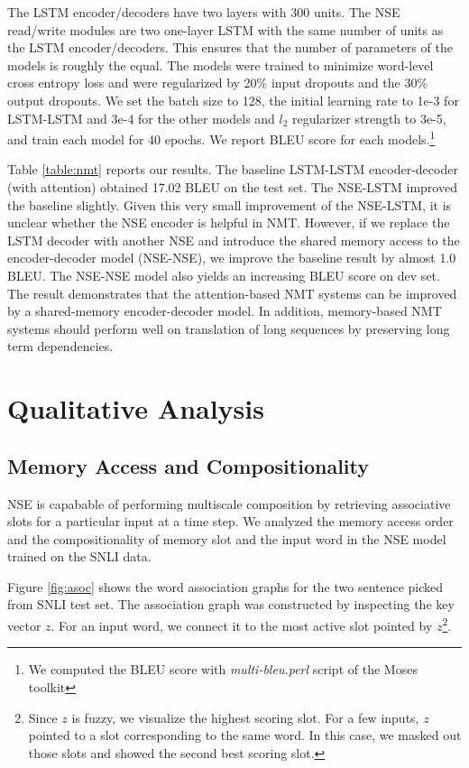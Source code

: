 \documentclass{article}
\begin{document}
The LSTM encoder/decoders have two layers with 300 units. The NSE read/write modules are two one-layer LSTM with the same number of units as the LSTM encoder/decoders. This ensures that the number of parameters of the models is roughly the equal. The models were trained to minimize word-level cross entropy loss and were regularized by 20\% input dropouts and the 30\% output dropouts. We set the batch size to 128, the initial learning rate to 1e-3 for LSTM-LSTM and 3e-4 for the other models and $l_2$ regularizer strength to 3e-5, and train each model for 40 epochs. We report BLEU score for each models.\footnote{We computed the BLEU score with \textit{multi-bleu.perl} script of the Moses toolkit}

Table \ref{table:nmt} reports our results. The baseline LSTM-LSTM encoder-decoder (with attention) obtained 17.02 BLEU on the test set. The NSE-LSTM improved the baseline slightly. Given this very small improvement of the NSE-LSTM, it is unclear whether the NSE encoder is helpful in NMT. However, if we replace the LSTM decoder with another NSE and introduce the shared memory access to the encoder-decoder model (NSE-NSE), we improve the baseline result by almost 1.0 BLEU. The NSE-NSE model also yields an increasing BLEU score on dev set. 
The result demonstrates that the attention-based NMT systems can be improved by a shared-memory encoder-decoder model. In addition, memory-based NMT systems should perform well on translation of long sequences by preserving long term dependencies.

\section{Qualitative Analysis}
\subsection{Memory Access and Compositionality}
NSE is capabable of performing multiscale composition by retrieving associative slots for a particular input at a time step. We analyzed the memory access order and the compositionality of memory slot and the input word in the NSE model trained on the SNLI data.

Figure \ref{fig:asoc} shows the word association graphs for the two sentence picked from SNLI test set. The association graph was constructed by inspecting the key vector $z$. For an input word, we connect it to the most active slot pointed by $z$\footnote{Since $z$ is fuzzy, we visualize the highest scoring slot. For a few inputs, $z$ pointed to a slot corresponding to the same word. In this case, we masked out those slots and showed the second best scoring slot.}. 
\end{document}
